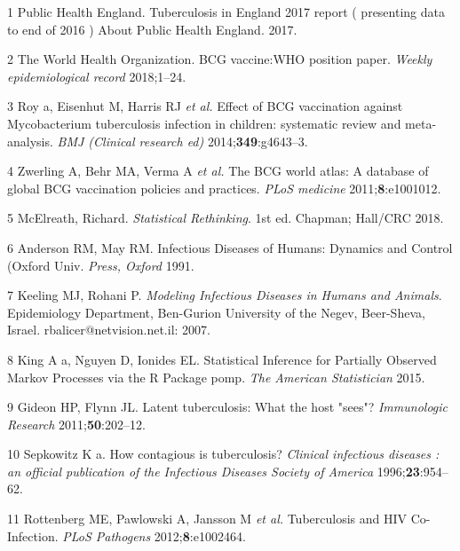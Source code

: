 \documentclass[11pt,twoside]{bristolthesis}
\begin{document}
  \hypertarget{refs}{}
  \leavevmode\hypertarget{ref-PHE2017}{}%
  1 Public Health England. Tuberculosis in England 2017 report ( presenting data to end of 2016 ) About Public Health England. 2017.
  
  \leavevmode\hypertarget{ref-TheWorldHealthOrganization:2018va}{}%
  2 The World Health Organization. BCG vaccine:WHO position paper. \emph{Weekly epidemiological record} 2018;1--24.
  
  \leavevmode\hypertarget{ref-Roy2014}{}%
  3 Roy a, Eisenhut M, Harris RJ \emph{et al.} Effect of BCG vaccination against Mycobacterium tuberculosis infection in children: systematic review and meta-analysis. \emph{BMJ (Clinical research ed)} 2014;\textbf{349}:g4643--3.
  
  \leavevmode\hypertarget{ref-Zwerling2011a}{}%
  4 Zwerling A, Behr MA, Verma A \emph{et al.} The BCG world atlas: A database of global BCG vaccination policies and practices. \emph{PLoS medicine} 2011;\textbf{8}:e1001012.
  
  \leavevmode\hypertarget{ref-McElreath:2018j}{}%
  5 McElreath, Richard. \emph{Statistical Rethinking}. 1st ed. Chapman; Hall/CRC 2018.
  
  \leavevmode\hypertarget{ref-Anderson1991}{}%
  6 Anderson RM, May RM. Infectious Diseases of Humans: Dynamics and Control (Oxford Univ. \emph{Press, Oxford} 1991.
  
  \leavevmode\hypertarget{ref-Keeling2007}{}%
  7 Keeling MJ, Rohani P. \emph{Modeling Infectious Diseases in Humans and Animals}. Epidemiology Department, Ben-Gurion University of the Negev, Beer-Sheva, Israel. rbalicer@netvision.net.il: 2007.
  
  \leavevmode\hypertarget{ref-King}{}%
  8 King A a, Nguyen D, Ionides EL. Statistical Inference for Partially Observed Markov Processes via the R Package pomp. \emph{The American Statistician} 2015.
  
  \leavevmode\hypertarget{ref-Gideon2011a}{}%
  9 Gideon HP, Flynn JL. Latent tuberculosis: What the host "sees"? \emph{Immunologic Research} 2011;\textbf{50}:202--12.
  
  \leavevmode\hypertarget{ref-Sepkowitz1996}{}%
  10 Sepkowitz K a. How contagious is tuberculosis? \emph{Clinical infectious diseases : an official publication of the Infectious Diseases Society of America} 1996;\textbf{23}:954--62.
  
  \leavevmode\hypertarget{ref-Rottenberg2012}{}%
  11 Rottenberg ME, Pawlowski A, Jansson M \emph{et al.} Tuberculosis and HIV Co-Infection. \emph{PLoS Pathogens} 2012;\textbf{8}:e1002464.
  
\end{document}

